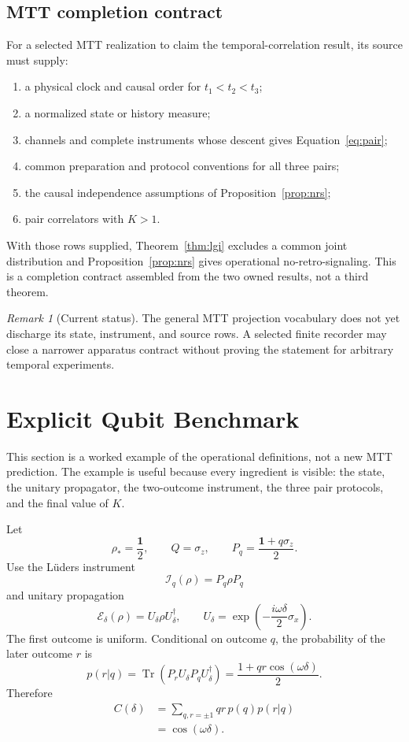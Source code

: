 \documentclass[11pt]{article}
\theoremstyle{definition}
\theoremstyle{remark}
\newtheorem{remark}{Remark}
\begin{document}
\subsection{MTT completion contract}

For a selected MTT realization to claim the temporal-correlation result, its
source must supply:
\begin{enumerate}[label=(\roman*)]
\item a physical clock and causal order for $t_1<t_2<t_3$;
\item a normalized state or history measure;
\item channels and complete instruments whose descent gives
  Equation~\eqref{eq:pair};
\item common preparation and protocol conventions for all three pairs;
\item the causal independence assumptions of Proposition~\ref{prop:nrs};
\item pair correlators with $K>1$.
\end{enumerate}
With those rows supplied, Theorem~\ref{thm:lgi} excludes a common joint
distribution and Proposition~\ref{prop:nrs} gives operational
no-retro-signaling.  This is a completion contract assembled from the two
owned results, not a third theorem.

\begin{remark}[Current status]
The general MTT projection vocabulary
does not yet discharge its state, instrument, and source rows.  A selected
finite recorder may close a narrower apparatus contract without proving the
statement for arbitrary temporal experiments.
\end{remark}

\section{Explicit Qubit Benchmark}

This section is a worked example of the operational definitions, not a new
MTT prediction.  The example is useful because every ingredient is visible:
the state, the unitary propagator, the two-outcome instrument, the three pair
protocols, and the final value of $K$.
\label{sec:qubit}

Let
\[
\rho_\ast=\frac{\mathbf1}{2},\qquad
Q=\sigma_z,\qquad
P_q=\frac{\mathbf1+q\sigma_z}{2}.
\]
Use the L\"uders instrument
\[
\mathcal I_q(\rho)=P_q\rho P_q
\]
and unitary propagation
\[
\mathcal E_\delta(\rho)
=U_\delta\rho U_\delta^\dagger,\qquad
U_\delta=\exp\!\left(-\frac{i\omega\delta}{2}\sigma_x\right).
\]
The first outcome is uniform.  Conditional on outcome $q$, the probability of
the later outcome $r$ is
\[
p(r|q)=\operatorname{Tr}
\left(P_rU_\delta P_qU_\delta^\dagger\right)
=\frac{1+qr\cos(\omega\delta)}{2}.
\]
Therefore
\begin{equation}
\begin{aligned}
C(\delta)
&=\sum_{q,r=\pm1}qr\,p(q)p(r|q)\\
&=\cos(\omega\delta).
\end{aligned}
\label{eq:qubitcorr}
\end{equation}
\end{document}
